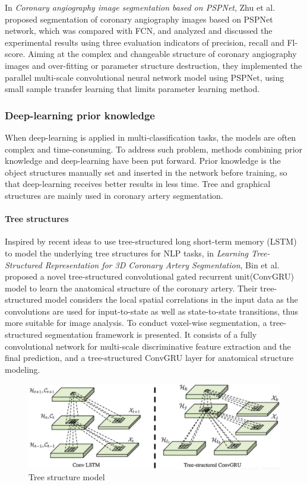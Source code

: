 \documentclass[lang=cn,11pt,a4paper,cite=numbers]{elegantpaper}
\begin{document}
In \emph{Coronary angiography image segmentation based on PSPNet}\cite{19}, Zhu et al. proposed segmentation of coronary angiography images based on PSPNet network, which was compared with FCN, and analyzed and discussed the experimental results using three evaluation indicators of precision, recall and Fl-score. Aiming at the complex and changeable structure of coronary angiography images and over-fitting or parameter structure destruction, they implemented the parallel multi-scale convolutional neural network model using PSPNet, using small sample transfer learning that limits parameter learning method.

\subsubsection{Deep-learning prior knowledge}

When deep-learning is applied in multi-classification tasks, the models are often complex and time-consuming. To address such problem, methods combining prior knowledge and deep-learning have been put forward. Prior knowledge is the object structures manually set and inserted in the network before training, so that deep-learning receives better results in less time. Tree and graphical structures are mainly used in coronary artery segmentation.

\paragraph{Tree structures}

Inspired by recent ideas to use tree-structured long short-term memory (LSTM) to model the underlying tree structures for NLP tasks, in \emph{Learning Tree-Structured Representation for 3D Coronary Artery Segmentation}\cite{20}, Bin et al. proposed a novel tree-structured convolutional gated recurrent unit(ConvGRU) model to learn the anatomical structure of the coronary artery. Their tree-structured model considers the local spatial correlations in the input data as the convolutions are used for input-to-state as well as state-to-state transitions, thus more suitable for image analysis. To conduct voxel-wise segmentation, a tree-structured segmentation framework is presented. It consists of a fully convolutional network for multi-scale discriminative feature extraction and the final prediction, and a tree-structured ConvGRU layer for anatomical structure modeling.

\begin{figure}[H]
    \centering
    \includegraphics[scale=0.5]{./image/文献综述/树结构.png}
    \caption{Tree structure model}
    \label{fig:Tree}
\end{figure}
\end{document}
